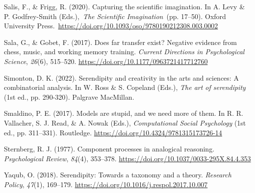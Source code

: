\documentclass[authordate, commentary]{jote-new-article}
\begin{document}
	Salis, F., \& Frigg, R. (2020). Capturing the scientific imagination. In A. Levy \& P. Godfrey-Smith (Eds.), \emph{The Scientific Imagination} (pp. 17--50). Oxford University Press. \url{https://doi.org/10.1093/oso/9780190212308.003.0002}



	Sala, G., \& Gobet, F. (2017). Does far transfer exist? Negative evidence from chess, music, and working memory training. \emph{Current Directions in Psychological Science}, \emph{26}(6), 515--520. \url{https://doi.org/10.1177/0963721417712760}



	Simonton, D. K. (2022). Serendipity and creativity in the arts and sciences: A combinatorial analysis. In W. Ross \& S. Copeland (Eds.), \emph{The art of serendipity }(1st ed., pp. 290-320). Palgrave MacMillan.



	Smaldino, P. E. (2017). Models are stupid, and we need more of them. In R. R. Vallacher, S. J. Read, \& A. Nowak (Eds.), \emph{Computational Social Psychology} (1st ed., pp. 311--331). Routledge. \url{https://doi.org/10.4324/9781315173726-14}



	Sternberg, R. J. (1977). Component processes in analogical reasoning. \emph{Psychological Review}, \emph{84}(4), 353--378. \url{https://doi.org/10.1037/0033-295X.84.4.353}



	Yaqub, O. (2018). Serendipity: Towards a taxonomy and a theory. \emph{Research Policy}, \emph{47}(1), 169--179. \url{https://doi.org/10.1016/j.respol.2017.10.007}
\end{document}
